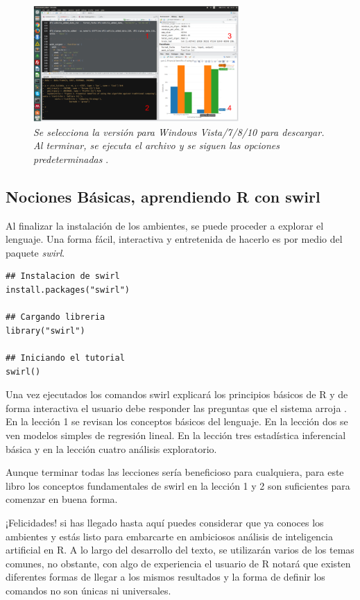 \documentclass[letterpaper,12pt, spanish, oneside]{book} %
\begin{document}
\begin{figure}[H]
\centering
\includegraphics[width=0.7\textwidth]{t4.png}
\caption{\label{fig:frog2}\textit{Se selecciona la versión para Windows Vista/7/8/10 para descargar. Al terminar, se ejecuta el archivo y se siguen las opciones predeterminadas }.}
\end{figure}

\subsection{Nociones Básicas, aprendiendo R con swirl}
Al finalizar la instalación de los ambientes, se puede proceder a explorar el lenguaje. Una forma fácil, interactiva y entretenida de hacerlo es por medio del paquete \textit{swirl}. 

\begin{lstlisting}
## Instalacion de swirl
install.packages("swirl")

## Cargando libreria
library("swirl")

## Iniciando el tutorial
swirl()
\end{lstlisting}

Una vez ejecutados los comandos swirl explicará los principios básicos de R y de forma interactiva el usuario debe responder las preguntas que el sistema arroja . En la lección 1 se revisan los conceptos básicos del lenguaje. En la lección dos se ven modelos simples de regresión lineal. En la lección tres estadística inferencial básica y en la lección cuatro análisis exploratorio.

Aunque terminar todas las lecciones sería beneficioso para cualquiera, para este libro los conceptos fundamentales de swirl en la lección 1 y 2 son suficientes para comenzar en buena forma. 

¡Felicidades! si has llegado hasta aquí puedes considerar que ya conoces los ambientes y estás listo para embarcarte en ambiciosos análisis de inteligencia artificial en R. A lo largo del desarrollo del texto, se utilizarán varios de los temas comunes, no obstante, con algo de experiencia el usuario de R notará que existen diferentes formas de llegar a los mismos resultados y la forma de definir los comandos no son únicas ni universales.
\end{document}

